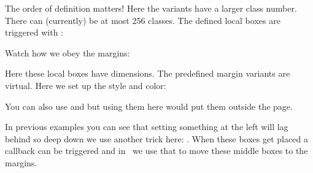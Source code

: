 \startbuffer[definition]

\stopbuffer

\typebuffer[definition][option=TEX]

\getbuffer[definition]

The order of definition matters! Here the  variants have a larger class
number. There can (currently) be at most 256 classes. The defined local boxes
are triggered with \type {\localbox}:

\startbuffer[example]
\startnarrower
{}%
\localbox[lefttext]{[L] }%
\localbox[lefttextx]{[LL] }%
\localbox[righttext]{ [RR]}%
\localbox[righttextx]{ [R]}%
%
\stopnarrower
\stopbuffer

\typebuffer[example][option=TEX]

Watch how we obey the margins:

\getbuffer[example]

Here these local boxes have dimensions. The predefined margin variants are
virtual. Here we set up the style and color:

\startbuffer[definition]
\setuplocalboxes
  [leftmargin]
  [style=\bs,
   color=darkgreen]
\setuplocalboxes
  [rightmargin]
  [style=\bs,
   color=darkred]
\stopbuffer

\typebuffer[definition][option=TEX]

\startbuffer[example]
\stopbuffer

\typebuffer[example][option=TEX]

You can also use  and  but using them here would
put them outside the page.

{}

In previous examples you can see that setting something at the left will lag behind
so deep down we use another trick here: \type {\localmiddlebox}. When these boxes
get placed a callback can be triggered and in \CONTEXT\ we use that to move these
middle boxes to the margins.

